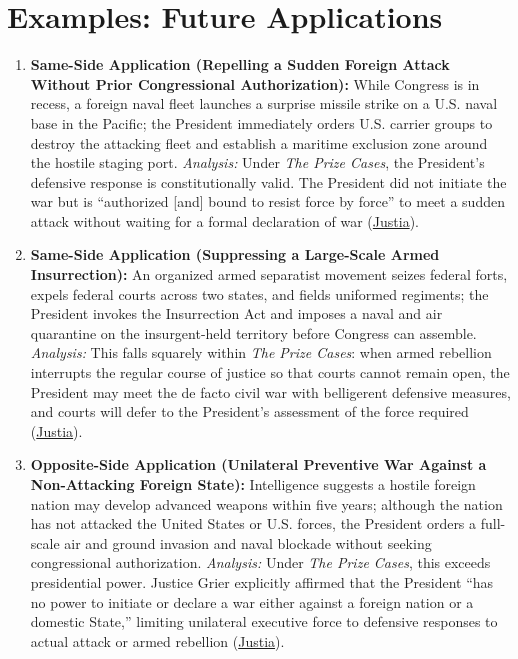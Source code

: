 \documentclass[12pt]{article}
\begin{document}
\section{Examples: Future Applications}

\begin{enumerate}
\item \textbf{Same-Side Application (Repelling a Sudden Foreign Attack Without Prior Congressional Authorization):} While Congress is in recess, a foreign naval fleet launches a surprise missile strike on a U.S. naval base in the Pacific; the President immediately orders U.S. carrier groups to destroy the attacking fleet and establish a maritime exclusion zone around the hostile staging port. \textit{Analysis:} Under \textit{The Prize Cases}, the President's defensive response is constitutionally valid. The President did not initiate the war but is ``authorized [and] bound to resist force by force'' to meet a sudden attack without waiting for a formal declaration of war (\href{https://supreme.justia.com/cases/federal/us/67/635/}{Justia}).

\item \textbf{Same-Side Application (Suppressing a Large-Scale Armed Insurrection):} An organized armed separatist movement seizes federal forts, expels federal courts across two states, and fields uniformed regiments; the President invokes the Insurrection Act and imposes a naval and air quarantine on the insurgent-held territory before Congress can assemble. \textit{Analysis:} This falls squarely within \textit{The Prize Cases}: when armed rebellion interrupts the regular course of justice so that courts cannot remain open, the President may meet the de facto civil war with belligerent defensive measures, and courts will defer to the President's assessment of the force required (\href{https://supreme.justia.com/cases/federal/us/67/635/}{Justia}).

\item \textbf{Opposite-Side Application (Unilateral Preventive War Against a Non-Attacking Foreign State):} Intelligence suggests a hostile foreign nation may develop advanced weapons within five years; although the nation has not attacked the United States or U.S. forces, the President orders a full-scale air and ground invasion and naval blockade without seeking congressional authorization. \textit{Analysis:} Under \textit{The Prize Cases}, this exceeds presidential power. Justice Grier explicitly affirmed that the President ``has no power to initiate or declare a war either against a foreign nation or a domestic State,'' limiting unilateral executive force to defensive responses to actual attack or armed rebellion (\href{https://supreme.justia.com/cases/federal/us/67/635/}{Justia}).


\end{enumerate}
\end{document}

